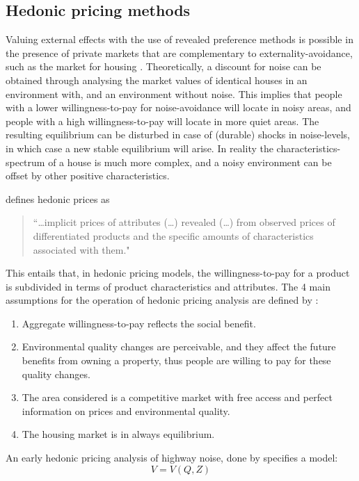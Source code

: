 \documentclass[a4paper]{scrartcl}
\begin{document}
\subsection{Hedonic pricing methods}

Valuing external effects with the use of revealed preference methods is possible in the presence of private markets that are complementary to externality-avoidance, such as the market for housing \citep{Nelson2008}. Theoretically, a discount for noise can be obtained through analysing the market values of identical houses in an environment with, and an environment without noise. This implies that people with a lower willingness-to-pay for noise-avoidance will locate in noisy areas, and people with a high willingness-to-pay will locate in more quiet areas. The resulting equilibrium can be disturbed in case of (durable) shocks in noise-levels, in which case a new stable equilibrium will arise. In reality the characteristics-spectrum of a house is much more complex, and a noisy environment can be offset by other positive characteristics.

\cite{Rosen1974} defines hedonic prices as 
\begin{quote}``\dots implicit prices of attributes (\dots) revealed (\dots) from observed prices of differentiated products and the specific amounts of characteristics associated with them."\end{quote} 
This entails that, in hedonic pricing models, the willingness-to-pay for a product is subdivided in terms of product characteristics and attributes. The 4 main assumptions for the operation of hedonic pricing analysis are defined by \cite{Bateman1993}:
\begin{enumerate}
	\item Aggregate willingness-to-pay reflects the social benefit.
	\item Environmental quality changes are perceivable, and they affect the future benefits from owning a property, thus people are willing to pay for these quality changes.
	\item The area considered is a competitive market with free access and perfect information on prices and environmental quality.
	\item The housing market is in always equilibrium.
\end{enumerate}

An early hedonic pricing analysis of highway noise, done by \cite{Nelson1982} specifies a model:
\begin{equation}
V = V(Q, Z)
\end{equation}
\end{document}
